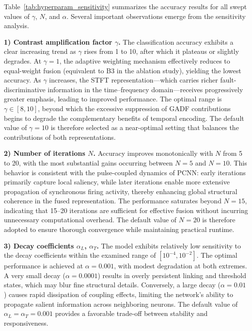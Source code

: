 \documentclass[journal]{IEEEtran}
\begin{document}
Table~\ref{tab:hyperparam_sensitivity} summarizes the accuracy results for all swept values of $\gamma$, $N$, and $\alpha$. Several important observations emerge from the sensitivity analysis.

\textbf{1) Contrast amplification factor $\gamma$.} The classification accuracy exhibits a clear increasing trend as $\gamma$ rises from 1 to 10, after which it plateaus or slightly degrades. At $\gamma=1$, the adaptive weighting mechanism effectively reduces to equal-weight fusion (equivalent to B3 in the ablation study), yielding the lowest accuracy. As $\gamma$ increases, the STFT representation—which carries richer fault-discriminative information in the time--frequency domain—receives progressively greater emphasis, leading to improved performance. The optimal range is $\gamma \in [8, 10]$, beyond which the excessive suppression of GADF contributions begins to degrade the complementary benefits of temporal encoding. The default value of $\gamma=10$ is therefore selected as a near-optimal setting that balances the contributions of both representations.

\textbf{2) Number of iterations $N$.} Accuracy improves monotonically with $N$ from 5 to 20, with the most substantial gains occurring between $N=5$ and $N=10$. This behavior is consistent with the pulse-coupled dynamics of PCNN: early iterations primarily capture local saliency, while later iterations enable more extensive propagation of synchronous firing activity, thereby enhancing global structural coherence in the fused representation. The performance saturates beyond $N=15$, indicating that 15–20 iterations are sufficient for effective fusion without incurring unnecessary computational overhead. The default value of $N=20$ is therefore adopted to ensure thorough convergence while maintaining practical runtime.

\textbf{3) Decay coefficients $\alpha_L$, $\alpha_T$.} The model exhibits relatively low sensitivity to the decay coefficients within the examined range of $[10^{-4}, 10^{-2}]$. The optimal performance is achieved at $\alpha=0.001$, with modest degradation at both extremes. A very small decay ($\alpha=0.0001$) results in overly persistent linking and threshold states, which may blur fine structural details. Conversely, a large decay ($\alpha=0.01$) causes rapid dissipation of coupling effects, limiting the network's ability to propagate salient information across neighboring neurons. The default value of $\alpha_L=\alpha_T=0.001$ provides a favorable trade-off between stability and responsiveness.
\end{document}
